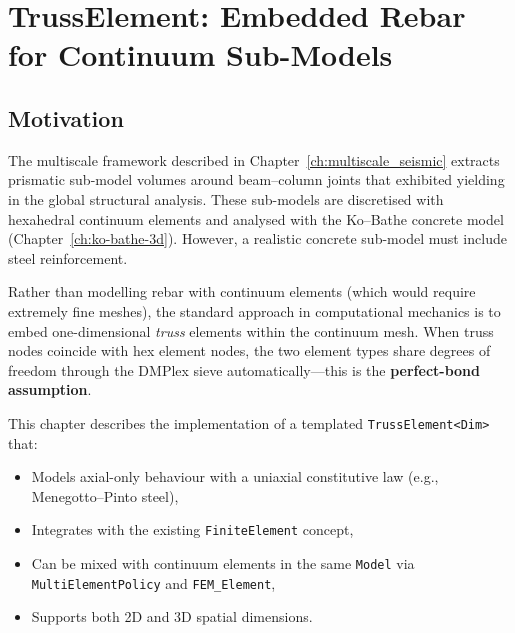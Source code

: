
\chapter{TrussElement: Embedded Rebar for Continuum Sub-Models}
\label{ch:truss-element}

\section{Motivation}
\label{sec:truss-motivation}

The multiscale framework described in Chapter~\ref{ch:multiscale_seismic}
extracts prismatic sub-model volumes around beam--column joints that
exhibited yielding in the global structural analysis.  These sub-models
are discretised with hexahedral continuum elements and analysed with the
Ko--Bathe concrete model (Chapter~\ref{ch:ko-bathe-3d}).  However, a
realistic concrete sub-model must include steel reinforcement.

Rather than modelling rebar with continuum elements (which would require
extremely fine meshes), the standard approach in computational mechanics
is to embed one-dimensional \emph{truss} elements within the continuum
mesh.  When truss nodes coincide with hex element nodes, the two
element types share degrees of freedom through the DMPlex sieve
automatically---this is the \textbf{perfect-bond assumption}.

This chapter describes the implementation of a templated
\texttt{TrussElement<Dim>} that:
\begin{itemize}
    \item Models axial-only behaviour with a uniaxial constitutive law
          (e.g., Menegotto--Pinto steel),
    \item Integrates with the existing \texttt{FiniteElement} concept,
    \item Can be mixed with continuum elements in the same
          \texttt{Model} via \texttt{MultiElementPolicy} and \texttt{FEM\_Element},
    \item Supports both 2D and 3D spatial dimensions.
\end{itemize}


